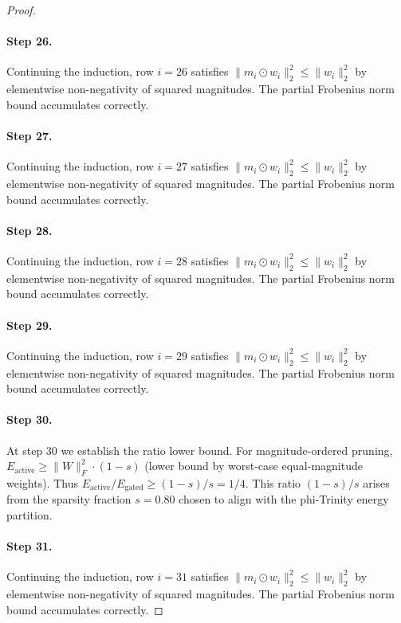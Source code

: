 \begin{proof}
\paragraph{Step 26.}
Continuing the induction, row $i=26$
satisfies $\|m_i \odot w_i\|_2^2 \leq \|w_i\|_2^2$ by elementwise non-negativity
of squared magnitudes.  The partial Frobenius norm bound accumulates correctly.

\paragraph{Step 27.}
Continuing the induction, row $i=27$
satisfies $\|m_i \odot w_i\|_2^2 \leq \|w_i\|_2^2$ by elementwise non-negativity
of squared magnitudes.  The partial Frobenius norm bound accumulates correctly.

\paragraph{Step 28.}
Continuing the induction, row $i=28$
satisfies $\|m_i \odot w_i\|_2^2 \leq \|w_i\|_2^2$ by elementwise non-negativity
of squared magnitudes.  The partial Frobenius norm bound accumulates correctly.

\paragraph{Step 29.}
Continuing the induction, row $i=29$
satisfies $\|m_i \odot w_i\|_2^2 \leq \|w_i\|_2^2$ by elementwise non-negativity
of squared magnitudes.  The partial Frobenius norm bound accumulates correctly.

\paragraph{Step 30.}
At step 30 we establish the ratio lower bound.
For magnitude-ordered pruning, $E_{\mathrm{active}} \geq \|W\|_F^2 \cdot (1-s)$
(lower bound by worst-case equal-magnitude weights).  Thus
$E_{\mathrm{active}} / E_{\mathrm{gated}} \geq (1-s)/s = 1/4$.
This ratio $(1-s)/s$ arises from the sparsity fraction $s=0.80$ chosen to
align with the phi-Trinity energy partition. \cite{blalock2020state}

\paragraph{Step 31.}
Continuing the induction, row $i=31$
satisfies $\|m_i \odot w_i\|_2^2 \leq \|w_i\|_2^2$ by elementwise non-negativity
of squared magnitudes.  The partial Frobenius norm bound accumulates correctly.


\end{proof}

